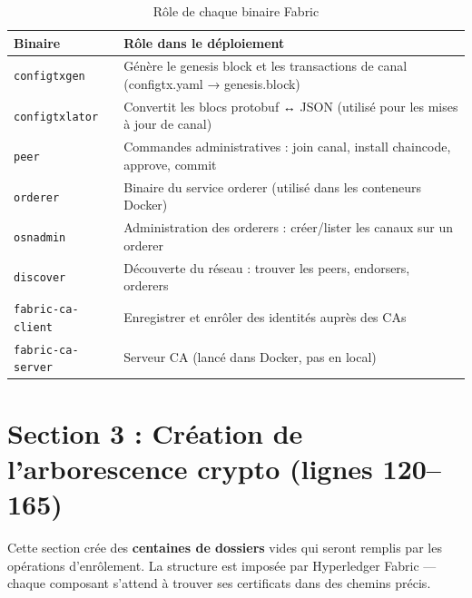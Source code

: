 \documentclass[12pt,a4paper,twoside]{report}
\begin{document}
\begin{table}[H]
\centering
\begin{tabularx}{\textwidth}{lX}
\toprule
\textbf{Binaire} & \textbf{Rôle dans le déploiement} \\
\midrule
\texttt{configtxgen} & Génère le genesis block et les transactions de canal (configtx.yaml → genesis.block) \\
\texttt{configtxlator} & Convertit les blocs protobuf ↔ JSON (utilisé pour les mises à jour de canal) \\
\texttt{peer} & Commandes administratives : join canal, install chaincode, approve, commit \\
\texttt{orderer} & Binaire du service orderer (utilisé dans les conteneurs Docker) \\
\texttt{osnadmin} & Administration des orderers : créer/lister les canaux sur un orderer \\
\texttt{discover} & Découverte du réseau : trouver les peers, endorsers, orderers \\
\texttt{fabric-ca-client} & Enregistrer et enrôler des identités auprès des CAs \\
\texttt{fabric-ca-server} & Serveur CA (lancé dans Docker, pas en local) \\
\bottomrule
\end{tabularx}
\caption{Rôle de chaque binaire Fabric}
\end{table}

\section{Section 3 : Création de l'arborescence crypto (lignes 120--165)}

Cette section crée des \textbf{centaines de dossiers} vides qui seront remplis par les opérations d'enrôlement. La structure est imposée par Hyperledger Fabric --- chaque composant s'attend à trouver ses certificats dans des chemins précis.
\end{document}
